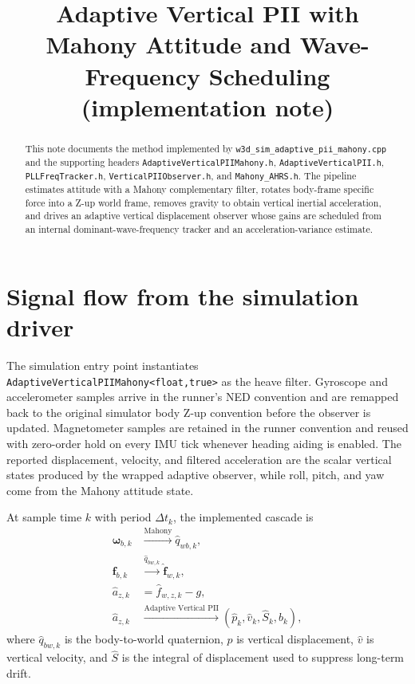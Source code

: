 \documentclass[conference]{IEEEtran}
\title{Adaptive Vertical PII with Mahony Attitude and Wave-Frequency Scheduling\\(implementation note)}
\author{\IEEEauthorblockN{OpenAI Codex} \IEEEauthorblockA{Repository documentation draft}}
\newcommand{\vct}[1]{\bm{#1}}
\begin{document}
\maketitle
\begin{abstract}
This note documents the method implemented by \texttt{w3d\_sim\_adaptive\_pii\_mahony.cpp} and the supporting headers \texttt{AdaptiveVerticalPIIMahony.h}, \texttt{AdaptiveVerticalPII.h}, \texttt{PLLFreqTracker.h}, \texttt{VerticalPIIObserver.h}, and \texttt{Mahony\_AHRS.h}. The pipeline estimates attitude with a Mahony complementary filter, rotates body-frame specific force into a Z-up world frame, removes gravity to obtain vertical inertial acceleration, and drives an adaptive vertical displacement observer whose gains are scheduled from an internal dominant-wave-frequency tracker and an acceleration-variance estimate.
\end{abstract}
\section{Signal flow from the simulation driver}
The simulation entry point instantiates \texttt{AdaptiveVerticalPIIMahony<float,true>} as the heave filter. Gyroscope and accelerometer samples arrive in the runner's NED convention and are remapped back to the original simulator body Z-up convention before the observer is updated. Magnetometer samples are retained in the runner convention and reused with zero-order hold on every IMU tick whenever heading aiding is enabled. The reported displacement, velocity, and filtered acceleration are the scalar vertical states produced by the wrapped adaptive observer, while roll, pitch, and yaw come from the Mahony attitude state.

At sample time $k$ with period $\Delta t_k$, the implemented cascade is
\begin{align}
\vct{\omega}_{b,k} &\xrightarrow{\text{Mahony}} \hat{q}_{wb,k}, \\
\vct{f}_{b,k} &\xrightarrow{\hat{q}_{bw,k}} \hat{\vct{f}}_{w,k}, \\
\hat{a}_{z,k} &= \hat{f}_{w,z,k} - g, \\
\hat{a}_{z,k} &\xrightarrow{\text{Adaptive Vertical PII}} (\hat{p}_k,\hat{v}_k,\hat{S}_k,\hat{b}_k),
\end{align}
where $\hat{q}_{bw,k}$ is the body-to-world quaternion, $\hat{p}$ is vertical displacement, $\hat{v}$ is vertical velocity, and $\hat{S}$ is the integral of displacement used to suppress long-term drift.
\end{document}
